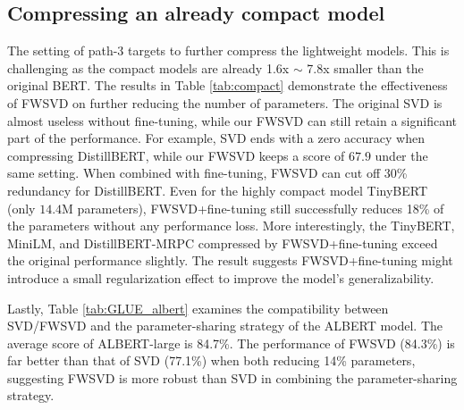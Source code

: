 \documentclass{article} %
\begin{document}
\subsection{Compressing an already compact model}\label{sec:path3}
The setting of path-3 targets to further compress the lightweight models.
This is challenging as the compact models are already 1.6x $\sim$ 7.8x smaller than the original BERT. 
The results in Table \ref{tab:compact} demonstrate the effectiveness of FWSVD on further reducing the number of parameters. 
The original SVD is almost useless without fine-tuning, while our FWSVD can still retain a significant part of the performance.
For example, SVD ends with a zero accuracy when compressing DistillBERT, while our FWSVD keeps a score of $67.9$ under the same setting.
When combined with fine-tuning, FWSVD can cut off 30\% redundancy for DistillBERT. Even for the highly compact model TinyBERT (only $14.4$M parameters),
FWSVD+fine-tuning still successfully reduces 18\% of the parameters without any performance loss. 
More interestingly, the TinyBERT, MiniLM, and DistillBERT-MRPC compressed by FWSVD+fine-tuning exceed the original performance slightly. The result suggests FWSVD+fine-tuning might introduce a small regularization effect to improve the model's generalizability. 

Lastly, Table \ref{tab:GLUE_albert} examines the compatibility between SVD/FWSVD and the parameter-sharing strategy of the ALBERT model. The average score of ALBERT-large is 84.7\%. The performance of FWSVD (84.3\%) is far better than that of SVD (77.1\%) when both reducing 14\% parameters, suggesting FWSVD is more robust than SVD in combining the parameter-sharing strategy.  
\end{document}
